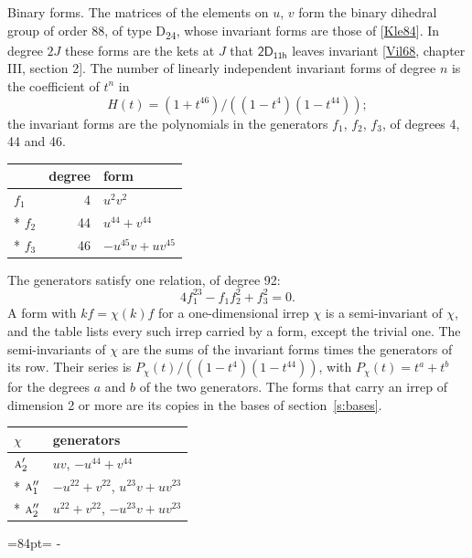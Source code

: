 \documentclass[10pt,a4paper]{article}
\makeatletter
\renewcommand\paragraph{\@startsection{paragraph}{4}{\z@}{1.5ex plus .5ex minus .2ex}{-1em}%
  {\normalfont\small\sffamily\bfseries\color{parttitle}}}
\newcommand{\needspace}[1]{\par\penalty-100\begingroup\dimen0=#1\relax\dimen2=\pagegoal
  \advance\dimen2-\pagetotal\ifdim\dimen0>\dimen2\relax\ifdim\dimen2>0pt\vfil\break\fi\fi
  \endgroup}
\numberwithin{equation}{section}
\newcommand{\grp}[1]{\mathsf{#1}}
\newcommand{\irr}[1]{\text{\normalfont\scshape #1}}
\makeatother
\begin{document}
\paragraph{Binary forms.}
The matrices of the elements on $u$, $v$ form the binary dihedral group of order 88, of type D\textsubscript{24}, whose invariant forms are those of [\href{../../../REFERENCES.pdf\#ref.Kle84}{Kle84}]. In degree $2J$ these forms are the kets at $J$ that $\grp{2D_{11h}}$ leaves invariant [\href{../../../REFERENCES.pdf\#ref.Vil68}{Vil68}, chapter III, section 2]. \label{n:head.degree}\label{n:head.form}The number of linearly independent invariant forms of degree $n$ is the coefficient of $t^n$ in
\begin{equation}\label{e:molien}H(t) = (1 + t^{46})/((1-t^{4})(1-t^{44}));\end{equation}
the invariant forms are the polynomials in the generators $f_1$, $f_2$, $f_3$, of degrees 4, 44 and 46.
{\small\begin{longtable}{@{}lrl@{}}\toprule
& degree & form\\\midrule\endhead
\bottomrule\endfoot\endlastfoot
$f_{1}$ & 4 & $u^{2}v^{2}$\\*
$f_{2}$ & 44 & $u^{44} + v^{44}$\\*
$f_{3}$ & 46 & $-u^{45}v + uv^{45}$\\
\bottomrule\end{longtable}}
The generators satisfy one relation, of degree 92:
\begin{equation}\label{e:relation}4f_{1}^{23} - f_{1}f_{2}^{2} + f_{3}^{2} = 0.\end{equation}
A form with $k f = \chi(k) f$ for a one-dimensional irrep $\chi$ is a semi-invariant of $\chi$, and the table lists every such irrep carried by a form, except the trivial one. \label{n:head.generators}The semi-invariants of $\chi$ are the sums of the invariant forms times the generators of its row. Their series is $P_\chi(t)/((1-t^{4})(1-t^{44}))$, with $P_\chi(t) = t^{a} + t^{b}$ for the degrees $a$ and $b$ of the two generators. The forms that carry an irrep of dimension 2 or more are its copies in the bases of section~\ref{s:bases}.
{\small\begin{longtable}{@{}ll@{}}\toprule
$\chi$ & generators\\\midrule\endhead
\bottomrule\endfoot\endlastfoot
$\irr{a}_{2}'$ & $uv$, $-u^{44} + v^{44}$\\*
$\irr{a}_{1}''$ & $-u^{22} + v^{22}$, $u^{23}v + uv^{23}$\\*
$\irr{a}_{2}''$ & $u^{22} + v^{22}$, $-u^{23}v + uv^{23}$\\
\bottomrule\end{longtable}}
\needspace{84pt}
\end{document}
